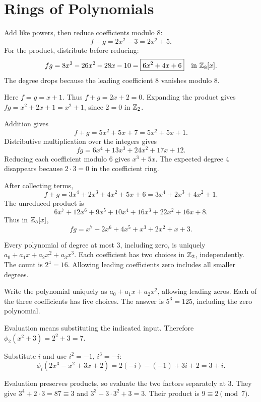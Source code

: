 \section{Rings of Polynomials}

Add like powers, then reduce coefficients modulo $8$:
\[f+g=2x^2-3=\boxed{2x^2+5}.
\]
For the product, distribute before reducing:
\[fg=8x^3-26x^2+28x-10=\boxed{6x^2+4x+6}\quad\text{in }\mathbb{Z}_8[x].
\]
The degree drops because the leading coefficient $8$ vanishes modulo $8$.

Here $f=g=x+1$. Thus $f+g=2x+2=\boxed0$. Expanding the product gives $fg=x^2+2x+1=\boxed{x^2+1}$, since $2=0$ in $\mathbb{Z}_2$.

Addition gives
\[f+g=5x^2+5x+7=\boxed{5x^2+5x+1}.
\]
Distributive multiplication over the integers gives
\[fg=6x^4+13x^3+24x^2+17x+12.
\]
Reducing each coefficient modulo $6$ gives $\boxed{x^3+5x}$. The expected degree $4$ disappears because $2\cdot3=0$ in the coefficient ring.

After collecting terms,
\[f+g=3x^4+2x^3+4x^2+5x+6
=\boxed{3x^4+2x^3+4x^2+1}.
\]
The unreduced product is
\[6x^7+12x^6+9x^5+10x^4+16x^3+22x^2+16x+8.
\]
Thus in $\mathbb{Z}_5[x]$,
\[\boxed{fg=x^7+2x^6+4x^5+x^3+2x^2+x+3}.
\]

Every polynomial of degree at most $3$, including zero, is uniquely $a_0+a_1x+a_2x^2+a_3x^3$. Each coefficient has two choices in $\mathbb{Z}_2$, independently. The count is $\boxed{2^4=16}$. Allowing leading coefficients zero includes all smaller degrees.

Write the polynomial uniquely as $a_0+a_1x+a_2x^2$, allowing leading zeros. Each of the three coefficients has five choices. The answer is $\boxed{5^3=125}$, including the zero polynomial.

Evaluation means substituting the indicated input. Therefore $\phi_2(x^2+3)=2^2+3=\boxed7$.

Substitute $i$ and use $i^2=-1$, $i^3=-i$:
\[\phi_i(2x^3-x^2+3x+2)=2(-i)-(-1)+3i+2=\boxed{3+i}.
\]

Evaluation preserves products, so evaluate the two factors separately at $3$. They give $3^4+2\cdot3=87\equiv3$ and $3^3-3\cdot3^2+3=3$. Their product is $9\equiv\boxed2\pmod7$.

